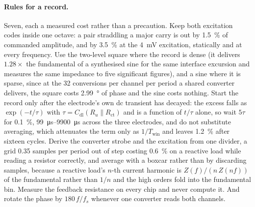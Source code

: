 
\paragraph{Rules for a record.} Seven, each a measured cost rather than a
precaution. Keep both excitation codes inside one octave: a pair straddling a
major carry is out by \SI{1.5}{\percent} of commanded amplitude, and by
\SI{3.5}{\percent} at the \SI{4}{\milli\volt} excitation, statically and at
every frequency. Use the two-level square where the record is dense (it
delivers \(1.28\times\) the fundamental of a synthesised sine for the same
interface excursion and measures the same impedance to five significant figures),
and a sine where it is sparse, since at the \num{32} conversions per channel
per period a shared converter delivers, the square costs \SI{2.99}{\degree} of
phase and the sine costs nothing. Start the record only after the electrode's
own dc transient has decayed: the excess falls as \(\exp(-t/\tau)\) with
\(\tau = C_{\mathrm{dl}}(R_u \parallel R_{\mathrm{ct}})\) and is a function of
\(t/\tau\) alone, so wait \(5\tau\) for \SI{0.1}{\percent},
\SIrange{99}{9900}{\micro\second} across the three electrodes, and do not
substitute averaging, which attenuates the term only as \(1/T_{\mathrm{win}}\)
and leaves \SI{1.2}{\percent} after sixteen cycles. Derive the converter strobe
and the excitation from one divider, a grid \num{0.35} samples per period out of
step costing \SI{0.6}{\percent} on a reactive load while reading a resistor
correctly, and average with a boxcar rather than by discarding samples, because
a reactive load's \(n\)-th current harmonic is \(Z(f)/(n\,Z(nf))\) of the
fundamental rather than \(1/n\) and the high orders fold into the fundamental
bin. Measure the feedback resistance on every chip and never compute it. And
rotate the phase by \(180\,f/f_s\) whenever one converter reads both channels.
